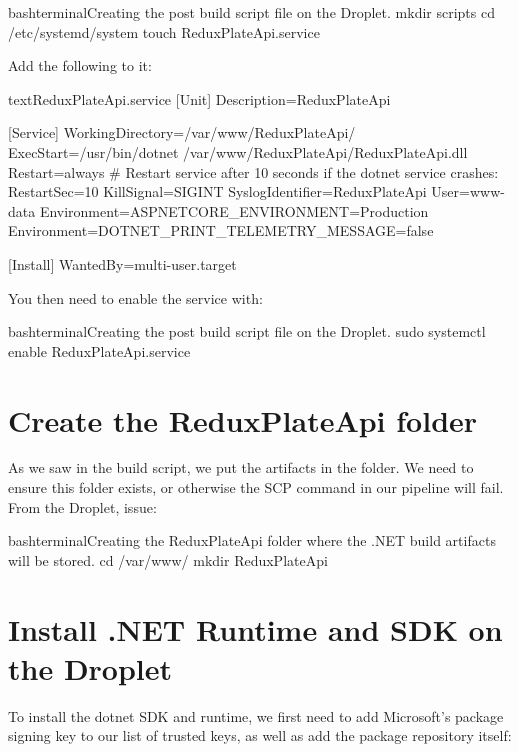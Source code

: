 \documentclass[a4paper,headinclude=on,footinclude=on,12pt,oneside]{scrbook}
\begin{document}
\begin{codeInput}{bash}{terminal}{Creating the post build script file on the Droplet.}
mkdir scripts
cd /etc/systemd/system
touch ReduxPlateApi.service
\end{codeInput}

Add the following to it:

\begin{codeInput}{text}{ReduxPlateApi.service}
[Unit]
Description=ReduxPlateApi

[Service]
WorkingDirectory=/var/www/ReduxPlateApi/
ExecStart=/usr/bin/dotnet /var/www/ReduxPlateApi/ReduxPlateApi.dll
Restart=always
# Restart service after 10 seconds if the dotnet service crashes:
RestartSec=10
KillSignal=SIGINT
SyslogIdentifier=ReduxPlateApi
User=www-data
Environment=ASPNETCORE_ENVIRONMENT=Production
Environment=DOTNET_PRINT_TELEMETRY_MESSAGE=false

[Install]
WantedBy=multi-user.target
\end{codeInput}

You then need to enable the service with:

\begin{codeInput}{bash}{terminal}{Creating the post build script file on the Droplet.}
sudo systemctl enable ReduxPlateApi.service
\end{codeInput}

\section{Create the ReduxPlateApi folder}

As we saw in the build script, we put the artifacts in the  folder. We need to ensure this folder exists, or otherwise the SCP command in our pipeline will fail. From the Droplet, issue:

\begin{codeInput}{bash}{terminal}{Creating the ReduxPlateApi folder where the .NET build artifacts will be stored.}
cd /var/www/
mkdir ReduxPlateApi
\end{codeInput}

\section{Install .NET Runtime and SDK on the Droplet}

To install the dotnet SDK and runtime, we first need to add Microsoft's package signing key to our list of trusted keys, as well as add the package repository itself:
\end{document}
